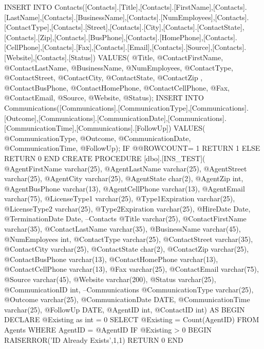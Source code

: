 INSERT INTO Contacts([Contacts].[Title],[Contacts].[FirstName],[Contacts].[LastName],[Contacts].[BusinessName],[Contacts].[NumEmployees],[Contacts].[ContactType],[Contacts].[Street],[Contacts].[City],[Contacts].[ContactState],[Contacts].[Zip],[Contacts].[BusPhone],[Contacts].[HomePhone],[Contacts].[CellPhone],[Contacts].[Fax],[Contacts].[Email],[Contacts].[Source],[Contacts].[Website],[Contacts].[Status])	
	VALUES(			 @Title,	        @ContactFirstName,	   @ContactLastName,     @BusinessName,	           @NumEmployees,            @ContactType,            @ContactStreet,     @ContactCity,     @ContactState,            @ContactZip ,    @ContactBusPhone,     @ContactHomePhone,     @ContactCellPhone,     @Fax,            @ContactEmail,     @Source,            @Website,            @Status);        
INSERT INTO	Communications([Communications].[CommunicationType],[Communications].[Outcome],[Communications].[CommunicationDate],[Communications].[CommunicationTime],[Communications].[FollowUp])	
	VALUES(				   @CommunicationType,                  @Outcome,                  @CommunicationDate,                  @CommunicationTime,                  @FollowUp);             			
			IF @@ROWCOUNT= 1
				RETURN 1
			ELSE
				RETURN 0
END
CREATE PROCEDURE [dbo].[INS_TEST](	
	@AgentFirstName varchar(25),
	@AgentLastName varchar(25),
	@AgentStreet varchar(25),
	@AgentCity varchar(25),
	@AgentState char(2),
	@AgentZip int,
	@AgentBusPhone varchar(13),
	@AgentCellPhone varchar(13),
	@AgentEmail varchar(75),
	@LicenseType1 varchar(25),
	@Type1Expiration varchar(25),
	@LicenseType2 varchar(25),
	@Type2Expiration varchar(25),
	@HireDate Date,
	@TerminationDate Date,
						--Contacts
	@Title varchar(25),
    @ContactFirstName varchar(35),
    @ContactLastName varchar(35),
    @BusinessName varchar(45),
    @NumEmployees int,
    @ContactType varchar(25),
    @ContactStreet varchar(35),
    @ContactCity varchar(25),
    @ContactState char(2),
    @ContactZip varchar(25),
    @ContactBusPhone varchar(13),
    @ContactHomePhone varchar(13),
    @ContactCellPhone varchar(13),
    @Fax varchar(25),
    @ContactEmail varchar(75),
    @Source varchar(45),
    @Website varchar(200),
    @Status varchar(25),
	@CommunicationID int,
					--Communications
	@CommunicationType varchar(25),	
	@Outcome varchar(25),
	@CommunicationDate DATE,
	@CommunicationTime varchar(25),
	@FollowUp DATE,
	@AgentID int,
	@ContactID int) AS BEGIN
DECLARE @Existing as int = 0
SELECT @Existing = Count(AgentID)
FROM Agents
WHERE AgentID = @AgentID
IF @Existing > 0 
BEGIN RAISERROR('ID Already Exists',1,1)
	RETURN 0 
END 
